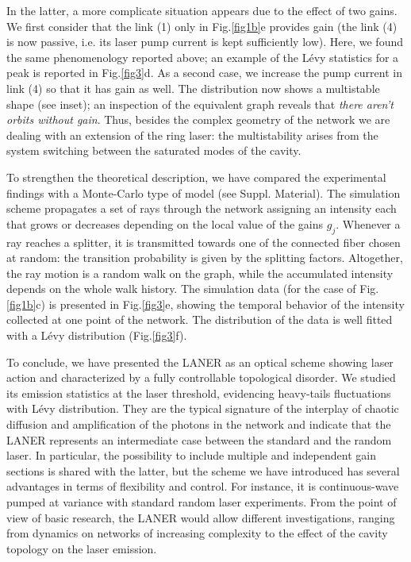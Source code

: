 \documentclass[aps,prl,twocolumn,showpacs,amsmath,amssymb,floatfix,superscriptaddress,
]{revtex4-1}
\begin{document}
In the latter, a more complicate situation appears due to the effect of two gains. We first consider that the link (1) only in Fig.\ref{fig1b}e provides gain (the link (4) is now passive, i.e. its laser pump current is kept sufficiently low). Here, we found the same phenomenology reported above; an example of the L\'evy statistics for a peak is reported in Fig.\ref{fig3}d. 
As a second case, we increase the pump current in link (4) so that it has gain as well. The distribution now shows a multistable shape (see inset); an inspection of the equivalent graph reveals that {\it there aren't orbits without gain}. Thus, besides the complex geometry of the network we are dealing with an extension of the ring laser: the multistability arises from the system switching between the saturated modes of the cavity. 

To strengthen the theoretical description, we have compared the experimental findings with a Monte-Carlo type of model (see Suppl. Material). The simulation scheme propagates a set of rays through the network assigning an intensity each that grows or decreases depending on the local value of the gains $g_j$. Whenever a ray reaches a splitter, it is transmitted towards one of the connected fiber chosen at random: the transition probability is given by the splitting factors. Altogether, the ray motion is a random walk on the graph, while the accumulated intensity depends on the whole walk history. The simulation data (for the case of Fig.\ref{fig1b}c) is presented in Fig.\ref{fig3}e, showing the temporal behavior of the intensity collected at one point of the network. The distribution of the data is well fitted with a L\'evy distribution (Fig.\ref{fig3}f).


To conclude, we have presented the LANER as an optical scheme showing laser action and characterized by a fully controllable topological disorder. We studied its emission statistics at the laser threshold, evidencing heavy-tails fluctuations with L\' evy distribution. They are the typical signature of the interplay of chaotic diffusion and amplification of the photons in the network and indicate that the LANER represents an intermediate case between the standard and the random laser.
In particular, the possibility to include multiple and independent gain sections is shared with the latter, but the scheme we have introduced has several advantages in terms of flexibility and control. For instance, it is continuous-wave pumped at variance with standard random laser experiments. From the point of view of basic research, the LANER would allow different investigations, ranging from dynamics on networks of increasing complexity to the effect of the cavity topology on the laser emission. 
\end{document}
